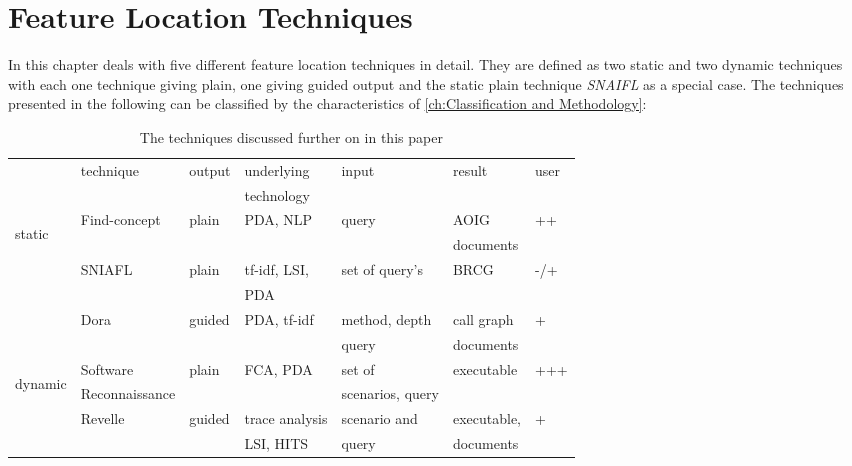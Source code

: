 \chapter{Feature Location Techniques}
\label{ch:feature location techniques}

In this chapter deals with five different feature location techniques in detail. They are defined as two static and two dynamic techniques with each one technique giving plain, one giving guided output and the static plain technique \emph{SNAIFL} as a special case. The techniques presented in the following can be classified by the characteristics of \autoref{ch:Classification and Methodology}:

\begin{table}[h]
	\begin{tabular}{|l| l l l l l l|}
		\hline
		 & technique &  output & underlying & input & result & user \\ 
		 &  &  &  technology &  &  &  \\ \hline
		 \multirow{5}{1em}{\begin{sideways} static \end{sideways}}
		 & Find-concept  & plain & PDA, NLP & query & AOIG & ++  \\
		 &      &        &             &         & documents  &   \\
		 & SNIAFL & plain & tf-idf, LSI, & set of query's & BRCG & -/+ \\ 
		 &        &       & PDA  &             &      &
		 \\ 
		 & Dora & guided & PDA, tf-idf & method, depth & call graph & + \\ 
		 &      &        &             & query         & documents  &   \\ \hline
		 \multirow{4}{1em}{\begin{sideways} dynamic \end{sideways}}
		 & Software & plain & FCA, PDA & set of & executable & +++ \\ 
		 & Reconnaissance &  &  & scenarios, query & & \\
		 & Revelle  & guided & trace analysis & scenario and & executable, & +\\
		 &   &  & LSI, HITS & query & documents & \\ \hline
		
	\end{tabular}
	\caption{The techniques discussed further on in this paper}
	\label{table:techniques overview}
\end{table}

